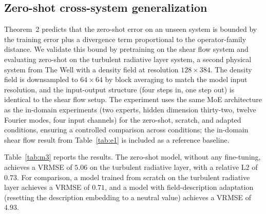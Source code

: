 \documentclass[preprint,12pt]{elsarticle}
\begin{document}
\subsection{Zero-shot cross-system generalization}
Theorem~2 predicts that the zero-shot error on an unseen system is bounded by the training error plus a divergence term proportional to the operator-family distance. We validate this bound by pretraining on the shear flow system and evaluating zero-shot on the turbulent radiative layer system, a second physical system from The Well with a density field at resolution $128\times384$. The density field is downsampled to $64\times64$ by block averaging to match the model input resolution, and the input-output structure (four steps in, one step out) is identical to the shear flow setup. The experiment uses the same MoE architecture as the in-domain experiments (two experts, hidden dimension thirty-two, twelve Fourier modes, four input channels) for the zero-shot, scratch, and adapted conditions, ensuring a controlled comparison across conditions; the in-domain shear flow result from Table~\ref{tab:e1} is included as a reference baseline.

Table~\ref{tab:m3} reports the results. The zero-shot model, without any fine-tuning, achieves a VRMSE of $5.06$ on the turbulent radiative layer, with a relative L2 of $0.73$. For comparison, a model trained from scratch on the turbulent radiative layer achieves a VRMSE of $0.71$, and a model with field-description adaptation (resetting the description embedding to a neutral value) achieves a VRMSE of $4.93$.
\end{document}

